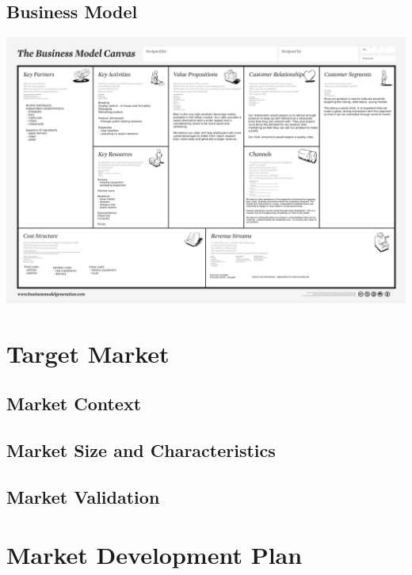 \documentclass[11pt]{article}
\begin{document}
  \subsection{Business Model}
  \newpage
  \includegraphics[angle=90,width=\textwidth,height=\textheight,keepaspectratio]{./business_model_canvas_poster.png}
\section{Target Market}
  \subsection{Market Context}
  \subsection{Market Size and Characteristics}
  \subsection{Market Validation}
\section{Market Development Plan}
\end{document}
